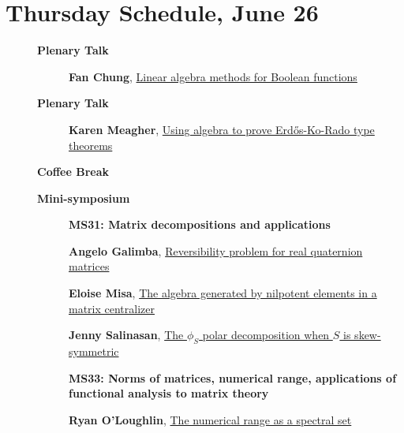 \documentclass[ILAS2025-program.tex]{subfiles}
\begin{document}
\section{Thursday Schedule, June 26}
    
    \begin{description}
    \item[] \textbf{Plenary Talk} 
    \begin{description}
        \item[] \hypertarget{up0006}{}\textbf{Fan Chung}, \hyperlink{down0006}{Linear algebra methods for Boolean functions}
        \end{description}
        \item[] \textbf{Plenary Talk} 
    \begin{description}
        \item[] \hypertarget{up0007}{}\textbf{Karen Meagher}, \hyperlink{down0007}{Using algebra to prove Erd\H{o}s-Ko-Rado type theorems
}
        \end{description}
        \item[] \textbf{Coffee Break} 
    \item[] \textbf{Mini-symposium} 
    \begin{description}
    \item[] {\color{mstitle}\textbf{MS31: Matrix decompositions and applications}} 
    \item[] \hypertarget{up0274}{}\textbf{Angelo Galimba}, \hyperlink{down0274}{Reversibility problem for real quaternion matrices}
        \item[] \hypertarget{up0275}{}\textbf{Eloise Misa}, \hyperlink{down0275}{The algebra generated by nilpotent elements in a matrix centralizer}
        \item[] \hypertarget{up0276}{}\textbf{Jenny Salinasan}, \hyperlink{down0276}{The $\phi_S$ polar decomposition when $S$ is skew-symmetric}
        \end{description}
    \begin{description}
    \item[] {\color{mstitle}\textbf{MS33: Norms of matrices, numerical range, applications of functional analysis to matrix theory}} 
    \item[] \hypertarget{up0277}{}\textbf{Ryan O'Loughlin}, \hyperlink{down0277}{The numerical range as a spectral set}

\end{description}
\end{description}
\end{document}
